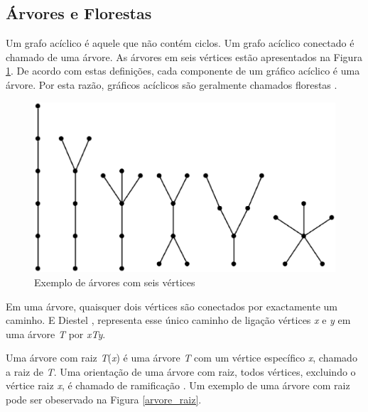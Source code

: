 \subsection{Árvores e Florestas}

Um grafo acíclico é aquele que não contém ciclos. Um grafo acíclico conectado é chamado de uma árvore. As árvores em seis vértices estão apresentados na Figura \ref{arvores_seis_vertices}. De acordo com estas definições, cada componente de um gráfico acíclico é uma árvore. Por esta razão, gráficos acíclicos são geralmente chamados florestas \cite{Bondy:2007}.

\begin{figure}[!h]
	\centering
	\includegraphics[scale=0.5]{figuras/capitulo1/arvores_seis_vertices.eps}
	\caption{Exemplo de árvores com seis vértices}
	\label{arvores_seis_vertices}
\end{figure}

Em uma árvore, quaisquer dois vértices são conectados por exactamente um caminho. E Diestel \cite{Diestel:1997}, representa esse único caminho de ligação vértices \textit{x} e \textit{y} em uma árvore \textit{T} por \textit{xTy}.

Uma árvore com raiz \textit{T}(\textit{x}) é uma árvore \textit{T} com um vértice específico \textit{x}, chamado a raiz de \textit{T}. Uma orientação de uma árvore com raiz, todos vértices, excluindo o vértice raiz \textit{x}, é chamado de ramificação \cite{Bondy:2007}. Um exemplo de uma árvore com raiz pode ser obeservado na Figura \ref{arvore_raiz}.


